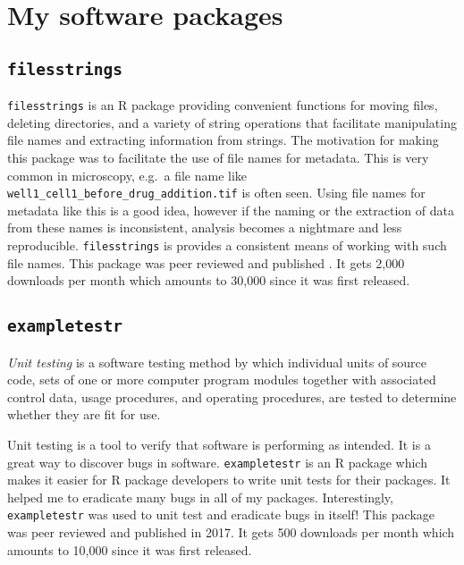 \documentclass[12pt,]{book}
\theoremstyle{definition}
\theoremstyle{definition}
\theoremstyle{definition}
\theoremstyle{remark}
\let\BeginKnitrBlock\begin \let\EndKnitrBlock\end
\begin{document}
\section{My software packages}\label{my-software-packages}

\subsection{\texorpdfstring{\texttt{filesstrings}}{filesstrings}}\label{filesstrings}

\texttt{filesstrings} is an R package providing convenient functions for
moving files, deleting directories, and a variety of string operations
that facilitate manipulating file names and extracting information from
strings. The motivation for making this package was to facilitate the
use of file names for metadata. This is very common in microscopy,
e.g.~a file name like \texttt{well1\_cell1\_before\_drug\_addition.tif}
is often seen. Using file names for metadata like this is a good idea,
however if the naming or the extraction of data from these names is
inconsistent, analysis becomes a nightmare and less reproducible.
\texttt{filesstrings} is provides a consistent means of working with
such file names. This package was peer reviewed and published
\citep{filesstrings}. It gets 2,000 downloads per month which amounts to
30,000 since it was first released.

\subsection{\texorpdfstring{\texttt{exampletestr}}{exampletestr}}\label{exampletestr}

\BeginKnitrBlock{definition}
\protect\hypertarget{def:unnamed-chunk-29}{}{\label{def:unnamed-chunk-29}
}\emph{Unit testing} is a software testing method by which individual
units of source code, sets of one or more computer program modules
together with associated control data, usage procedures, and operating
procedures, are tested to determine whether they are fit for use.
\EndKnitrBlock{definition}

Unit testing is a tool to verify that software is performing as
intended. It is a great way to discover bugs in software.
\texttt{exampletestr} is an R package which makes it easier for R
package developers to write unit tests for their packages. It helped me
to eradicate many bugs in all of my packages. Interestingly,
\texttt{exampletestr} was used to unit test and eradicate bugs in
itself! This package was peer reviewed and published in
2017.\citep{exampletestr} It gets 500 downloads per month which amounts
to 10,000 since it was first released.
\end{document}
